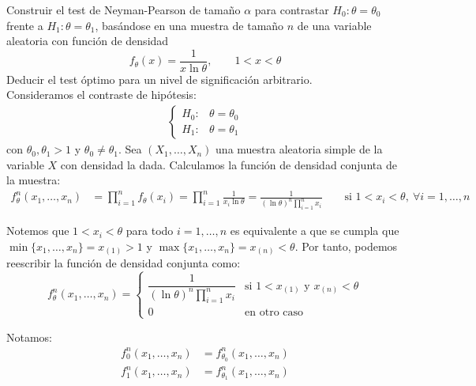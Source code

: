 \begin{ejercicio}
    Construir el test de Neyman-Pearson de tamaño $\alpha$ para contrastar $H_0:\theta = \theta_0$ frente a $H_1 : \theta = \theta_1$, basándose en una muestra de tamaño $n$ de una variable aleatoria con función de densidad
    \begin{equation*}
        f_\theta(x) = \frac{1}{x\ln \theta}, \qquad 1<x<\theta
    \end{equation*}
    Deducir el test óptimo para un nivel de significación arbitrario.\\

    Consideramos el contraste de hipótesis:
    \begin{align*}
        \begin{cases}
            H_0: & \theta = \theta_0 \\
            H_1: & \theta = \theta_1
        \end{cases}
    \end{align*}
    con $\theta_0, \theta_1 > 1$ y $\theta_0 \neq \theta_1$. Sea $(X_1, \ldots, X_n)$ una muestra aleatoria simple de la variable $X$ con densidad la dada. Calculamos la función de densidad conjunta de la muestra:
    \begin{align*}
        f_\theta^n(x_1, \ldots, x_n) &= \prod_{i=1}^{n} f_\theta(x_i) = \prod_{i=1}^{n} \frac{1}{x_i\ln \theta} = \frac{1}{(\ln \theta)^n \prod\limits_{i=1}^{n} x_i} \qquad \text{si\ } 1 < x_i < \theta, \ \forall i=1,\ldots,n
    \end{align*}

    Notemos que $1 < x_i < \theta$ para todo $i=1,\ldots,n$ es equivalente a que se cumpla que $\min\{x_1, \ldots, x_n\} = x_{(1)} > 1$ y $\max\{x_1, \ldots, x_n\} = x_{(n)} < \theta$. Por tanto, podemos reescribir la función de densidad conjunta como:
    \begin{equation*}
        f_\theta^n(x_1, \ldots, x_n) = \begin{cases}
            \dfrac{1}{(\ln \theta)^n \prod\limits_{i=1}^{n} x_i} & \text{si\ } 1 < x_{(1)} \text{\ y\ } x_{(n)} < \theta \\[14pt]
            0 & \text{en otro caso}
        \end{cases}
    \end{equation*}

    Notamos:
    \begin{align*}
        f_0^n(x_1, \ldots, x_n) &= f_{\theta_0}^n(x_1, \ldots, x_n) \\
        f_1^n(x_1, \ldots, x_n) &= f_{\theta_1}^n(x_1, \ldots, x_n)
    \end{align*}


\end{ejercicio}

